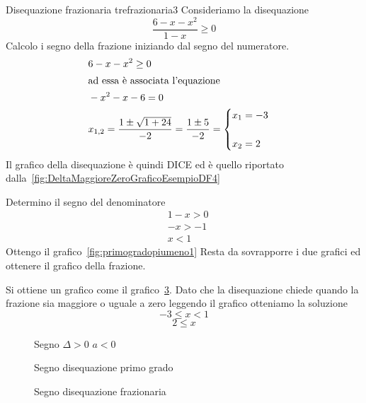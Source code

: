 \begin{esempiot}{Disequazione frazionaria tre}{frazionaria3} 
	Consideriamo la disequazione \[\dfrac{6-x-x^2}{1-x}\geq 0 \]
Calcolo i segno della frazione iniziando dal segno  del numeratore.
\begin{align*}
&6-x-x^2\geq0\\
\intertext{ad essa è associata l'equazione}
&-x^2-x-6=0\\
&x_{1,2}=\dfrac{1\pm\sqrt{1+24}}{-2}=\dfrac{1\pm5}{-2}=
\begin{cases}
x_1=-3\\
\\x_2=2
\end{cases}
\end{align*}
Il grafico della disequazione è quindi DICE ed è quello riportato dalla~\vref{fig:DeltaMaggioreZeroGraficoEsempioDF4}

Determino il segno del denominatore
\begin{align*}
&1-x>0\\
&-x>-1\\
&x<1
\end{align*}
Ottengo il grafico~\vref{fig:primogradopiumeno1}
Resta da sovrapporre i due grafici ed ottenere il grafico della frazione.

Si ottiene un grafico come il grafico~\cref{fig:DFesempio3}. Dato che la disequazione chiede quando la frazione sia maggiore o uguale a zero leggendo il grafico otteniamo la soluzione \[-3\leq x<1\]
\[2\leq x\]
\end{esempiot}
\begin{figure}
	\centering
	
	\caption{Segno $\Delta>0$ $a<0$}
	\label{fig:DeltaMaggioreZeroGraficoEsempioDF4}
\end{figure}
\begin{figure}
	\centering 
	
	\caption{Segno disequazione primo grado}
	\label{fig:primogradopiumeno1}
\end{figure}
\begin{figure}
	\centering
	
	\caption{Segno disequazione frazionaria}
	\label{fig:DFesempio3}
\end{figure}